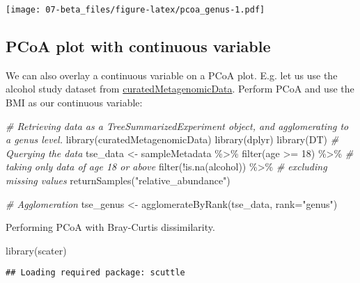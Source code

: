 \documentclass[
  oneside]{book}
\newenvironment{Shaded}{\begin{snugshade}}{\end{snugshade}}
\newcommand{\AttributeTok}[1]{\textcolor[rgb]{0.77,0.63,0.00}{#1}}
\newcommand{\CommentTok}[1]{\textcolor[rgb]{0.56,0.35,0.01}{\textit{#1}}}
\newcommand{\DecValTok}[1]{\textcolor[rgb]{0.00,0.00,0.81}{#1}}
\newcommand{\FunctionTok}[1]{\textcolor[rgb]{0.00,0.00,0.00}{#1}}
\newcommand{\NormalTok}[1]{#1}
\newcommand{\OtherTok}[1]{\textcolor[rgb]{0.56,0.35,0.01}{#1}}
\newcommand{\SpecialCharTok}[1]{\textcolor[rgb]{0.00,0.00,0.00}{#1}}
\newcommand{\StringTok}[1]{\textcolor[rgb]{0.31,0.60,0.02}{#1}}
\begin{document}
\texttt{[image: 07-beta\_files/figure-latex/pcoa\_genus-1.pdf]}

\hypertarget{pcoa-plot-with-continuous-variable}{%
\subsection{PCoA plot with continuous variable}\label{pcoa-plot-with-continuous-variable}}

We can also overlay a continuous variable on a PCoA plot. E.g. let us
use the alcohol study dataset from \href{https://bioconductor.org/packages/release/data/experiment/vignettes/curatedMetagenomicData/inst/doc/curatedMetagenomicData.html}{curatedMetagenomicData}.
Perform PCoA and use the BMI as our continuous variable:

\begin{Shaded}
\begin{Highlighting}[]
\CommentTok{\# Retrieving data as a TreeSummarizedExperiment object, and agglomerating to a genus level.}
\FunctionTok{library}\NormalTok{(curatedMetagenomicData)}
\FunctionTok{library}\NormalTok{(dplyr)}
\FunctionTok{library}\NormalTok{(DT)}
\CommentTok{\# Querying the data}
\NormalTok{tse\_data }\OtherTok{\textless{}{-}}\NormalTok{ sampleMetadata }\SpecialCharTok{\%\textgreater{}\%}
    \FunctionTok{filter}\NormalTok{(age }\SpecialCharTok{\textgreater{}=} \DecValTok{18}\NormalTok{) }\SpecialCharTok{\%\textgreater{}\%} \CommentTok{\# taking only data of age 18 or above}
    \FunctionTok{filter}\NormalTok{(}\SpecialCharTok{!}\FunctionTok{is.na}\NormalTok{(alcohol)) }\SpecialCharTok{\%\textgreater{}\%} \CommentTok{\# excluding missing values}
    \FunctionTok{returnSamples}\NormalTok{(}\StringTok{"relative\_abundance"}\NormalTok{)}

\CommentTok{\# Agglomeration}
\NormalTok{tse\_genus }\OtherTok{\textless{}{-}} \FunctionTok{agglomerateByRank}\NormalTok{(tse\_data, }\AttributeTok{rank=}\StringTok{"genus"}\NormalTok{)}
\end{Highlighting}
\end{Shaded}

Performing PCoA with Bray-Curtis dissimilarity.

\begin{Shaded}
\begin{Highlighting}[]
\FunctionTok{library}\NormalTok{(scater)}
\end{Highlighting}
\end{Shaded}

\begin{verbatim}
## Loading required package: scuttle
\end{verbatim}
\end{document}
